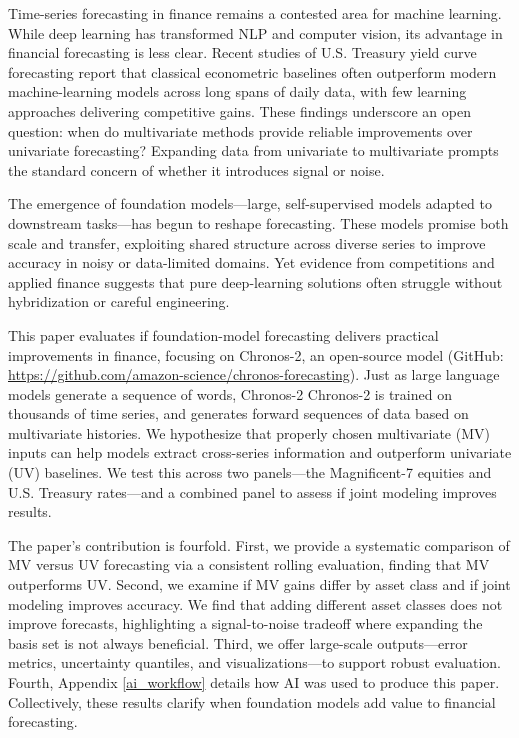 \documentclass[twocolumn]{article}
\begin{document}
Time-series forecasting in finance remains a contested area for machine learning. While deep learning has transformed NLP and computer vision, its advantage in financial forecasting is less clear. Recent studies of U.S. Treasury yield curve forecasting report that classical econometric baselines often outperform modern machine-learning models across long spans of daily data, with few learning approaches delivering competitive gains. These findings underscore an open question: when do multivariate methods provide reliable improvements over univariate forecasting? Expanding data from univariate to multivariate prompts the standard concern of whether it introduces signal or noise.

The emergence of foundation models—large, self-supervised models adapted to downstream tasks—has begun to reshape forecasting. These models promise both scale and transfer, exploiting shared structure across diverse series to improve accuracy in noisy or data-limited domains. Yet evidence from competitions and applied finance \citep{singh_yield_2025} suggests that pure deep-learning solutions often struggle without hybridization or careful engineering.

This paper evaluates if foundation-model forecasting delivers practical improvements in finance, focusing on Chronos-2, an open-source model (GitHub: \url{https://github.com/amazon-science/chronos-forecasting}). Just as large language models generate a sequence of words, Chronos-2 Chronos-2 is trained on thousands of time series, and generates forward sequences of data based on multivariate histories. We hypothesize that properly chosen multivariate (MV) inputs can help models extract cross-series information and outperform univariate (UV) baselines. We test this across two panels—the Magnificent-7 equities and U.S. Treasury rates—and a combined panel to assess if joint modeling improves results.

The paper’s contribution is fourfold. First, we provide a systematic comparison of MV versus UV forecasting via a consistent rolling evaluation, finding that MV outperforms UV. Second, we examine if MV gains differ by asset class and if joint modeling improves accuracy. We find that adding different asset classes does not improve forecasts, highlighting a signal-to-noise tradeoff where expanding the basis set is not always beneficial. Third, we offer large-scale outputs—error metrics, uncertainty quantiles, and visualizations—to support robust evaluation. Fourth, Appendix \ref{ai_workflow} details how AI was used to produce this paper. Collectively, these results clarify when foundation models add value to financial forecasting.
\end{document}
